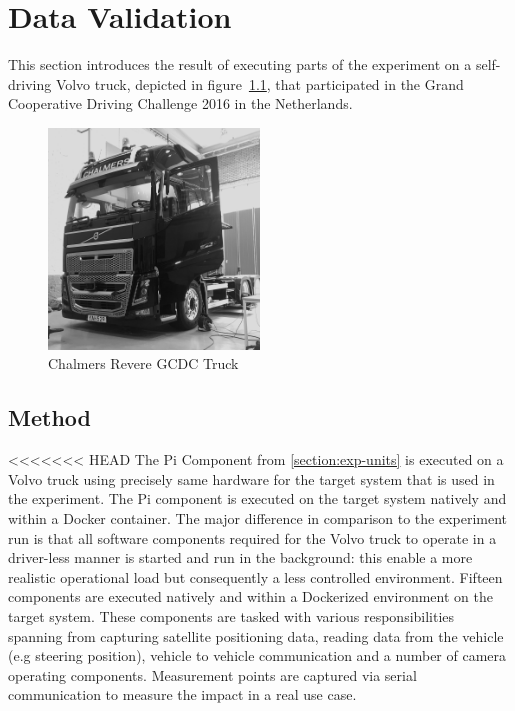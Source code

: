 \chapter{Data Validation}\label{section:data-validation}

This section introduces the result of executing parts of the experiment on a self-driving Volvo truck, depicted in figure~\ref{truck}, that participated in the Grand Cooperative Driving Challenge 2016 in the Netherlands. \\

\begin{figure}[ht]
\centering
     \includegraphics[width=0.5\textwidth]{./figure/truck.png}
      \caption{Chalmers Revere GCDC Truck}
       \label{truck}
\end{figure}


\section{Method}
<<<<<<< HEAD
The Pi Component from \ref{section:exp-units} is executed on a Volvo truck using precisely same hardware for the target system that is used in the experiment. The Pi component is executed on the target system natively and within a Docker container. The major difference in comparison to the experiment run is that all software components required for the Volvo truck to operate in a driver-less manner is started and run in the background: this enable a more realistic operational load but consequently a less controlled environment. Fifteen components are executed natively and within a Dockerized environment on the target system. These components are tasked with various responsibilities spanning from capturing satellite positioning data, reading data from the vehicle (e.g steering position), vehicle to vehicle communication and a number of camera operating components. Measurement points are captured via serial communication to measure the impact in a real use case. \\

